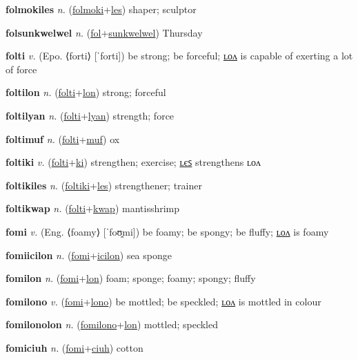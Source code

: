 \textbf{\hypertarget{folmokiles}{folmokiles}} \textit{n.} (\hyperlink{folmoki}{folmoki}+\allowbreak \hyperlink{les}{les})
shaper; sculptor

\textbf{\hypertarget{folsunkwelwel}{folsunkwelwel}} \textit{n.} (\hyperlink{fol}{fol}+\allowbreak \hyperlink{sunkwelwel}{sunkwelwel})
Thursday

\textbf{\hypertarget{folti}{folti}} \textit{v.} (Epo. ⟨forti⟩ [ˈforti])
be strong; be forceful; \hyperlink{foltilon}{ʟᴏᴧ} is capable of exerting a lot of force

\textbf{\hypertarget{foltilon}{foltilon}} \textit{n.} (\hyperlink{folti}{folti}+\allowbreak \hyperlink{lon}{lon})
strong; forceful

\textbf{\hypertarget{foltilyan}{foltilyan}} \textit{n.} (\hyperlink{folti}{folti}+\allowbreak \hyperlink{lyan}{lyan})
strength; force

\textbf{\hypertarget{foltimuf}{foltimuf}} \textit{n.} (\hyperlink{folti}{folti}+\allowbreak \hyperlink{muf}{muf})
ox

\textbf{\hypertarget{foltiki}{foltiki}} \textit{v.} (\hyperlink{folti}{folti}+\allowbreak \hyperlink{ki}{ki})
strengthen; exercise; \hyperlink{foltikiles}{ʟєꜱ} strengthens ʟᴏᴧ

\textbf{\hypertarget{foltikiles}{foltikiles}} \textit{n.} (\hyperlink{foltiki}{foltiki}+\allowbreak \hyperlink{les}{les})
strengthener; trainer

\textbf{\hypertarget{foltikwap}{foltikwap}} \textit{n.} (\hyperlink{folti}{folti}+\allowbreak \hyperlink{kwap}{kwap})
mantisshrimp

\textbf{\hypertarget{fomi}{fomi}} \textit{v.} (Eng. ⟨foamy⟩ [ˈfoʊ̯mi])
be foamy; be spongy; be fluffy; \hyperlink{fomilon}{ʟᴏᴧ} is foamy

\textbf{\hypertarget{fomiicilon}{fomiicilon}} \textit{n.} (\hyperlink{fomi}{fomi}+\allowbreak \hyperlink{icilon}{icilon})
sea sponge

\textbf{\hypertarget{fomilon}{fomilon}} \textit{n.} (\hyperlink{fomi}{fomi}+\allowbreak \hyperlink{lon}{lon})
foam; sponge; foamy; spongy; fluffy

\textbf{\hypertarget{fomilono}{fomilono}} \textit{v.} (\hyperlink{fomi}{fomi}+\allowbreak \hyperlink{lono}{lono})
be mottled; be speckled; \hyperlink{fomilonolon}{ʟᴏᴧ} is mottled in colour

\textbf{\hypertarget{fomilonolon}{fomilonolon}} \textit{n.} (\hyperlink{fomilono}{fomilono}+\allowbreak \hyperlink{lon}{lon})
mottled; speckled

\textbf{\hypertarget{fomiciuh}{fomiciuh}} \textit{n.} (\hyperlink{fomi}{fomi}+\allowbreak \hyperlink{ciuh}{ciuh})
cotton

